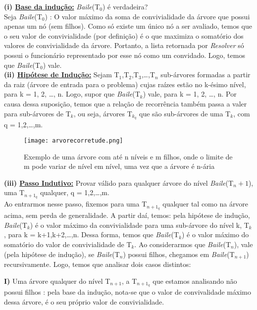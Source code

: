 \documentclass[a4paper]{article}
\begin{document}
\textbf{(i) \underline{Base da indução:}} \emph{Baile}(T$_{0}$) é verdadeira?\\
\qquad Seja \emph{Baile}(T$_0$) : O valor máximo da soma de convivialidade da árvore que possui apenas um nó (sem filhos). Como só existe um único nó a ser avaliado, temos que o seu valor de convivialidade (por definição) é o que maximiza o somatório dos valores de convivialidade da árvore. Portanto, a lista retornada por \emph{Resolver} só possui o funcionário representado por esse nó como um convidado. Logo, temos que \emph{Baile}(T$_{0}$) vale.\\

\textbf{(ii) \underline{Hipótese de Indução:}} Sejam  T$_{1}$,T$_{2}$,T$_{3}$,\ldots,T$_{n}$ sub-árvores formadas a partir da raiz (árvore de entrada para o problema) cujas raízes estão no k-ésimo nível, para k = 1, 2, \ldots, n. Logo, supor que \emph{Baile}(T$_k$) vale, para k = 1, 2, \ldots, n. Por causa dessa suposição, temos que a relação de recorrência também passa a valer para sub-árvores de T$_k$, ou seja, árvores T$_{k_q}$ que são sub-árvores de uma T$_k$, com q = 1,2,\ldots,m.\\

\begin{figure}[!htb]
\centering
\texttt{[image: arvorecorretude.png]}
\caption{Exemplo de uma árvore com até n níveis e m filhos, onde o limite de m pode variar de nível em nível, uma vez que a árvore é n-ária}
\label{arvorecorretude}
\end{figure}

\textbf{(iii) \underline{Passo Indutivo:}} Provar válido para qualquer árvore do nível \emph{Baile}(T$_n+1$), uma T$_{n+1_q}$ qualquer, q = 1,2,\ldots,m.\\
Ao entrarmos nesse passo, fixemos para uma T$_{n+1_q}$ qualquer tal como na árvore acima, sem perda de generalidade. A partir daí, temos:
pela hipótese de indução, \emph{Baile}(T$_k$) é o valor máximo da convivialidade para uma sub-árvore do nível k, T$_{k}$, para k = k+1,k+2,\ldots,n. Dessa forma, temos que \emph{Baile}(T$_k$) é o valor máximo do somatório do valor de convivialidade de T$_k$. Ao considerarmos que \emph{Baile}(T$_n$), vale (pela hipótese de indução), se \emph{Baile}(T$_n$) possui filhos, chegamos em \emph{Baile}(T$_{n+1}$) recursivamente. Logo, temos que analisar dois casos distintos:

\textbf{I)} Uma árvore qualquer do nível T$_{n+1}$, a T$_{n+1_q}$ que estamos analisando não possui filhos : pela base da indução, nota-se que o valor de convivalidade máximo dessa árvore, é o seu próprio valor de convivialidade.
\end{document}

